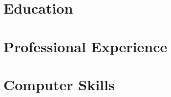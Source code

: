 \documentclass{moderncv}
\begin{document}
    

    \section{Education}
        

    \section{Professional Experience}
    	
        
    	
    \section{Computer Skills}
    	
\end{document}
